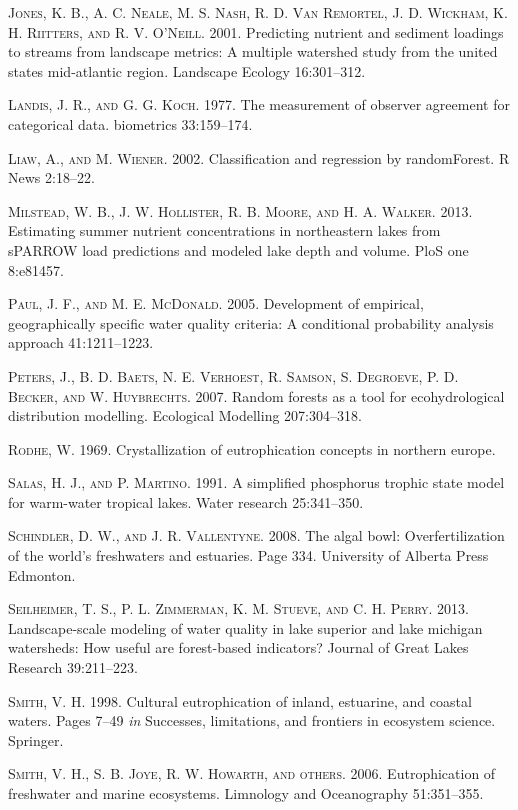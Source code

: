 \documentclass[11pt,]{article}
\begin{document}
\textsc{Jones, K. B., A. C. Neale, M. S. Nash, R. D. Van Remortel, J. D.
Wickham, K. H. Riitters, and R. V. O'Neill}. 2001. Predicting nutrient
and sediment loadings to streams from landscape metrics: A multiple
watershed study from the united states mid-atlantic region. Landscape
Ecology 16:301--312.

\textsc{Landis, J. R., and G. G. Koch}. 1977. The measurement of
observer agreement for categorical data. biometrics 33:159--174.

\textsc{Liaw, A., and M. Wiener}. 2002. Classification and regression by
randomForest. R News 2:18--22.

\textsc{Milstead, W. B., J. W. Hollister, R. B. Moore, and H. A.
Walker}. 2013. Estimating summer nutrient concentrations in northeastern
lakes from sPARROW load predictions and modeled lake depth and volume.
PloS one 8:e81457.

\textsc{Paul, J. F., and M. E. McDonald}. 2005. Development of
empirical, geographically specific water quality criteria: A conditional
probability analysis approach 41:1211--1223.

\textsc{Peters, J., B. D. Baets, N. E. Verhoest, R. Samson, S. Degroeve,
P. D. Becker, and W. Huybrechts}. 2007. Random forests as a tool for
ecohydrological distribution modelling. Ecological Modelling
207:304--318.

\textsc{Rodhe, W.} 1969. Crystallization of eutrophication concepts in
northern europe.

\textsc{Salas, H. J., and P. Martino}. 1991. A simplified phosphorus
trophic state model for warm-water tropical lakes. Water research
25:341--350.

\textsc{Schindler, D. W., and J. R. Vallentyne}. 2008. The algal bowl:
Overfertilization of the world's freshwaters and estuaries. Page 334.
University of Alberta Press Edmonton.

\textsc{Seilheimer, T. S., P. L. Zimmerman, K. M. Stueve, and C. H.
Perry}. 2013. Landscape-scale modeling of water quality in lake superior
and lake michigan watersheds: How useful are forest-based indicators?
Journal of Great Lakes Research 39:211--223.

\textsc{Smith, V. H.} 1998. Cultural eutrophication of inland,
estuarine, and coastal waters. Pages 7--49 \emph{in} Successes,
limitations, and frontiers in ecosystem science. Springer.

\textsc{Smith, V. H., S. B. Joye, R. W. Howarth, and others}. 2006.
Eutrophication of freshwater and marine ecosystems. Limnology and
Oceanography 51:351--355.
\end{document}

